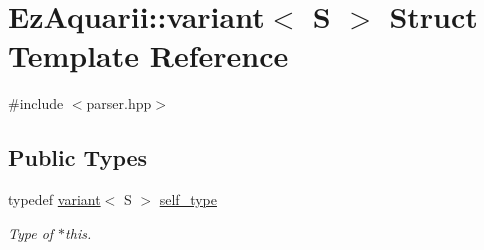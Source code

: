 \hypertarget{structEzAquarii_1_1variant}{}\section{Ez\+Aquarii\+:\+:variant$<$ S $>$ Struct Template Reference}
\label{structEzAquarii_1_1variant}


{\ttfamily \#include $<$parser.\+hpp$>$}

\subsection*{Public Types}
\begin{DoxyCompactItemize}
\item 
typedef \hyperlink{structEzAquarii_1_1variant}{variant}$<$ S $>$ \hyperlink{structEzAquarii_1_1variant_af94dbfa9a3e7310b9827d20cc65163a8}{self\+\_\+type}\hypertarget{structEzAquarii_1_1variant_af94dbfa9a3e7310b9827d20cc65163a8}{}\label{structEzAquarii_1_1variant_af94dbfa9a3e7310b9827d20cc65163a8}

\begin{DoxyCompactList}\small\item\em Type of $\ast$this. \end{DoxyCompactList}\end{DoxyCompactItemize}

